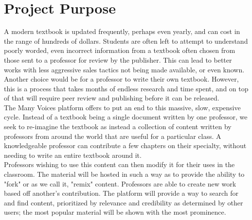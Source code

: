 \documentclass[onecolumn, draftclsnofoot,10pt, compsoc]{IEEEtran}
\begin{document}



\section{Project Purpose}
\noindent A modern textbook is updated frequently, perhaps even yearly,
and can cost in the range of hundreds of dollars. Students are often left
to attempt to understand poorly worded, even incorrect information from a textbook
often chosen from those sent to a professor for review by the publisher.
This can lead to better works with less aggressive sales tactics not being
made available, or even known.
Another choice would be for a professor to write their own textbook.
However, this is a process that takes months of endless research and
time spent, and on top of that will require peer review and publishing
before it can be released. \\

\noindent The Many Voices platform offers to put an end to this massive,
slow, expensive cycle.  Instead of a textbook being a single document
written by one professor, we seek to re-imagine the textbook as instead
a collection of content written by professors from around the world
that are useful for a particular class. A knowledgeable professor can
contribute a few chapters on their specialty, without needing to write
an entire textbook around it. \\

\noindent Professors wishing to use this content can then modify it for
their uses in the classroom. The material will be hosted in such a way
as to provide the ability to "fork" or as we call it, "remix" content. 
Professors are able to create new work based off another's contribution. 
The platform will provide a way to search for and find content,
prioritized by relevance and credibility as determined by other users;
the most popular material will be shown with the most prominence.
\end{document}
